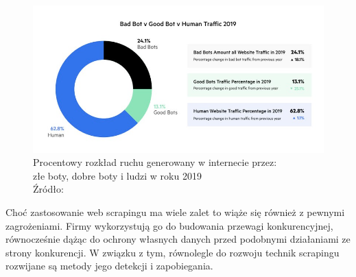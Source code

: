 \begin{figure}[H]
    \centering
    \captionsetup{width=.8\linewidth}
    \includegraphics[width=.8\textwidth]{img/bot-traffic}
    \caption{Procentowy rozkład ruchu generowany w internecie przez:\\ złe boty, dobre boty i ludzi w roku 2019\\Źródło: ~\cite{bot-traffic}}
    \label{fig:bot-traffic}
\end{figure}

Choć zastosowanie web scrapingu ma wiele zalet to wiąże się również z pewnymi zagrożeniami.
Firmy wykorzystują go do budowania przewagi konkurencyjnej, równocześnie dążąc do ochrony własnych danych przed podobnymi działaniami ze strony konkurencji.
W związku z tym, równolegle do rozwoju technik scrapingu rozwijane są metody jego detekcji i zapobiegania.

